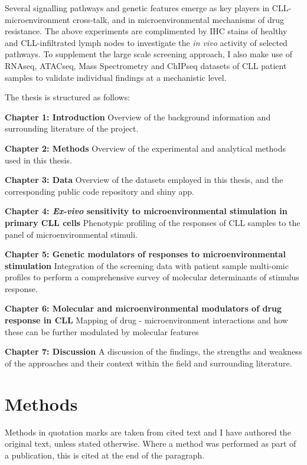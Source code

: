 \documentclass[11pt, a4paper, twosided]{book}
\begin{document}
Several signalling pathways and genetic features emerge as key players in CLL-microenvironment cross-talk, and in microenvironmental mechanisms of drug resistance. The above experiments are complimented by IHC stains of healthy and CLL-infiltrated lymph nodes to investigate the \emph{in vivo} activity of selected pathways. To supplement the large scale screening approach, I also make use of RNAseq, ATACseq, Mass Spectrometry and ChIPseq datasets of CLL patient samples to validate individual findings at a mechanistic level.

The thesis is structured as follows:

\textbf{Chapter 1: Introduction} Overview of the background information and surrounding literature of the project.

\textbf{Chapter 2: Methods} Overview of the experimental and analytical methods used in this thesis.

\textbf{Chapter 3: Data} Overview of the datasets employed in this thesis, and the corresponding public code repository and shiny app.

\textbf{Chapter 4: \emph{Ex-vivo} sensitivity to microenvironmental stimulation in primary CLL cells }
Phenotypic profiling of the responses of CLL samples to the panel of microenvironmental stimuli.

\textbf{Chapter 5: Genetic modulators of responses to microenvironmental stimulation} Integration of the screening data with patient sample multi-omic profiles to perform a comprehensive survey of molecular determinants of stimulus response.

\textbf{Chapter 6: Molecular and microenvironmental modulators of drug response in CLL} Mapping of drug - microenvironment interactions and how these can be further modulated by molecular features

\textbf{Chapter 7: Discussion } A discussion of the findings, the strengths and weakness of the approaches and their context within the field and surrounding literature.

\hypertarget{methods}{%
\chapter{Methods}\label{methods}}

Methods in quotation marks are taken from cited text and I have authored the original text, unless stated otherwise. Where a method was performed as part of a publication, this is cited at the end of the paragraph.
\end{document}

